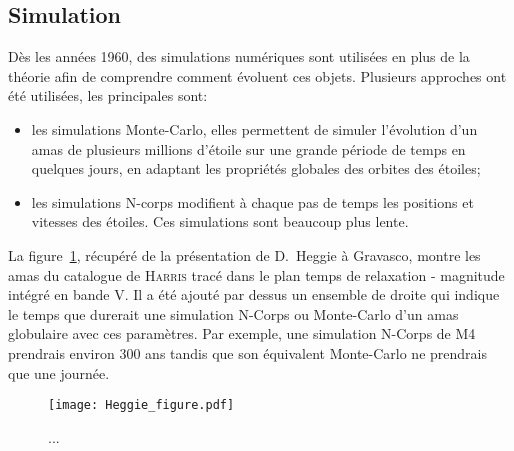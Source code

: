 		\subsection{Simulation}
			Dès les années 1960, des simulations numériques sont utilisées en plus de la
			théorie afin de comprendre comment évoluent ces objets.
			Plusieurs approches ont été utilisées, les principales sont:
			\begin{itemize}
					\item les simulations Monte-Carlo, elles permettent de
						simuler l'évolution d'un amas de plusieurs millions
						d'étoile sur une grande période de temps en quelques
						jours, en adaptant les propriétés globales des
						orbites des étoiles;
					\item les simulations N-corps modifient à chaque pas de
						temps les positions et vitesses des étoiles. Ces simulations sont beaucoup plus lente.
			\end{itemize}
			La figure~\ref{Fig::Intro::HeggieFigure}, récupéré de la présentation de
			D.~Heggie à Gravasco, montre les amas du catalogue de
			\textsc{Harris} tracé dans le plan temps de relaxation - magnitude intégré
			en bande V. Il a été ajouté par dessus un ensemble de droite qui indique le
			temps que durerait une simulation N-Corps ou Monte-Carlo d'un amas
			globulaire avec ces paramètres. Par exemple, une simulation N-Corps de M4
			prendrais environ 300 ans tandis que son équivalent Monte-Carlo ne prendrais
			que une journée.

			\begin{figure}
				\centering \texttt{[image: Heggie\_figure.pdf]}
				\caption{\label{Fig::Intro::HeggieFigure}...}
			\end{figure}



